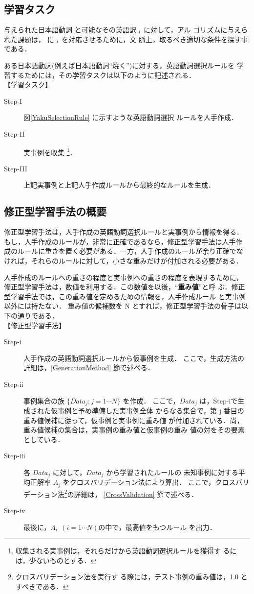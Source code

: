\subsection{学習タスク\label{LearningTask}}
与えられた日本語動詞 \myjv{} と可能なその英語訳 $_i$ に対して，アル
ゴリズムに与えられた課題は，\myjv{} に $_i$ を対応させるために，文
脈上，取るべき適切な条件を探す事である．

ある日本語動詞(例えば日本語動詞``焼く'')に対する，英語動詞選択ルールを
学習するためには，その学習タスクは以下のように記述される．\\

【学習タスク】
\begin{description}
\item[Step-I] 図\ref{YakuSelectionRule} に示すような英語動詞選択
ルールを人手作成．
\item[Step-II] 実事例を収集
\footnote{収集される実事例は，それらだけから英語動詞選択ルールを獲得す
るには，少ないものとする．}．
\item[Step-III] 上記実事例と上記人手作成ルールから最終的なルールを生成．
\end{description}

\subsection{修正型学習手法の概要\label{Outline}}
修正型学習手法は，人手作成の英語動詞選択ルールと実事例から情報を得る．
もし，人手作成のルールが，非常に正確であるなら，修正型学習手法は人手作
成のルールに重きを置く必要がある．一方，人手作成のルールが余り正確でな
ければ，それらのルールに対して，小さな重みだけが付加される必要がある．

人手作成のルールへの重さの程度と実事例への重さの程度を表現するために，
修正型学習手法は，数値を利用する．この数値を以後，``{\bf 重み値}''と呼
ぶ．修正型学習手法では，この重み値を定めるための情報を，人手作成ルール
と実事例以外には持たない．
重み値の候補数を N とすれば，修正型学習手法の骨子は以下の通りである．
\\

【修正型学習手法】
\begin{description}
\item[Step-i] 人手作成の英語動詞選択ルールから仮事例を生成．
ここで，生成方法の詳細は，\ref{GenerationMethod} 節で述べる．
\item[Step-ii] 事例集合の族 $\{Data_j ; j=1 \cdots N\}$ を作成．
ここで，$Data_j$ は，Step-iで生成された仮事例と予め準備した実事例全体
からなる集合で，第 j 番目の重み値候補に従って，仮事例と実事例に重み値
が付加されている．尚，重み値候補の集合は，実事例の重み値と仮事例の重み
値の対をその要素としている．
\item[Step-iii] 各 $Data_j$ に対して，$Data_j$ から学習されたルールの
未知事例に対する平均正解率 $A_j$ をクロスバリデーション法により算出．
ここで，クロスバリデーション法\footnote{クロスバリデーション法を実行す
る際には，テスト事例の重み値は，1.0 とすべきである．}の詳細は，
\ref{CrossValidation} 節で述べる．
\item[Step-iv] 最後に，$A_i~~(i=1 \cdots N)$の中で，最高値をもつルール
を出力．
\end{description}

